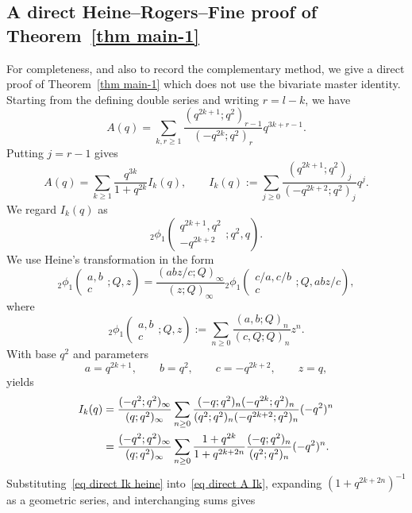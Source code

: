 \documentclass[reqno]{amsart}
\theoremstyle{definition}
\theoremstyle{plain}
\theoremstyle{remark}
\numberwithin{equation}{section}
\begin{document}
\subsection{A direct Heine--Rogers--Fine proof of Theorem~\ref{thm main-1}}\label{sec direct proof main-1}
For completeness, and also to record the complementary method, we give a direct proof of Theorem~\ref{thm main-1} which does not use the bivariate master identity.  Starting from the defining double series and writing $r=l-k$, we have
\begin{equation}\label{eq direct A start}
A(q)=\sum_{k,r\ge 1}\frac{(q^{2k+1};q^2)_{r-1}}{(-q^{2k};q^2)_r}q^{3k+r-1}.
\end{equation}
Putting $j=r-1$ gives
\begin{equation}\label{eq direct A Ik}
A(q)=\sum_{k\ge1}\frac{q^{3k}}{1+q^{2k}}I_k(q),\qquad
I_k(q):=\sum_{j\ge0}\frac{(q^{2k+1};q^2)_j}{(-q^{2k+2};q^2)_j}q^j.
\end{equation}
We regard $I_k(q)$ as
\[
{}_{2}\phi_{1}\left(\begin{matrix}q^{2k+1},q^2\\-q^{2k+2}\end{matrix};q^2,q\right).
\]
We use Heine's transformation in the form
\[
{}_{2}\phi_{1}\left(\begin{matrix}a,b\\c\end{matrix};Q,z\right)
=\frac{(abz/c;Q)_\infty}{(z;Q)_\infty}
{}_{2}\phi_{1}\left(\begin{matrix}c/a,c/b\\c\end{matrix};Q,abz/c\right),
\]
where
\[
{}_{2}\phi_{1}\left(\begin{matrix}a,b\\c\end{matrix};Q,z\right)
:=\sum_{n\ge0}\frac{(a,b;Q)_n}{(c,Q;Q)_n}z^n.
\]
With base $q^2$ and parameters
\[
a=q^{2k+1},\qquad b=q^2,\qquad c=-q^{2k+2},\qquad z=q,
\]
yields
\begin{align}
I_k(q)
&=\frac{(-q^2;q^2)_\infty}{(q;q^2)_\infty}
\sum_{n\ge0}\frac{(-q;q^2)_n(-q^{2k};q^2)_n}{(q^2;q^2)_n(-q^{2k+2};q^2)_n}(-q^2)^n \notag\\
&=\frac{(-q^2;q^2)_\infty}{(q;q^2)_\infty}
\sum_{n\ge0}\frac{1+q^{2k}}{1+q^{2k+2n}}\frac{(-q;q^2)_n}{(q^2;q^2)_n}(-q^2)^n . \label{eq direct Ik heine}
\end{align}
Substituting~\eqref{eq direct Ik heine} into~\eqref{eq direct A Ik}, expanding
$(1+q^{2k+2n})^{-1}$ as a geometric series, and interchanging sums gives
\end{document}
